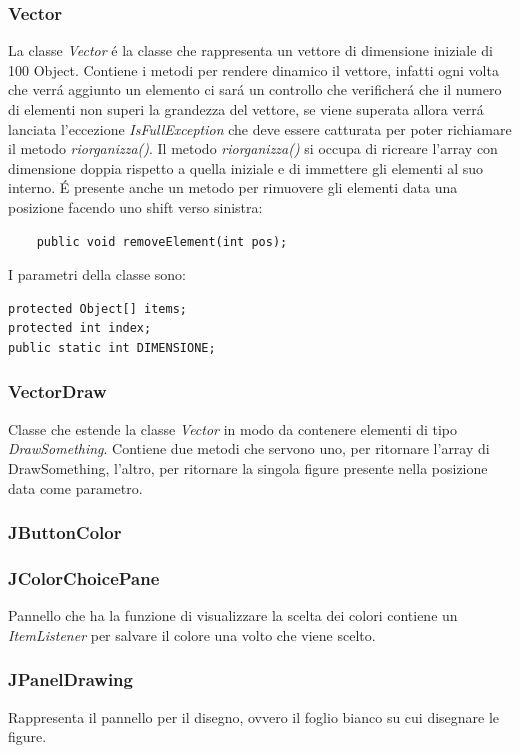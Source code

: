 \documentclass[a4paper,12pt,times,numbered,print,index]{article}
\begin{document}
\subsubsection{Vector}
La classe \textit{Vector} é la classe che rappresenta un vettore di dimensione iniziale di 100 Object. Contiene i metodi per rendere dinamico il vettore, infatti ogni volta che verrá aggiunto un elemento ci sará un controllo che verificherá che il numero di elementi non superi la grandezza del vettore, se viene superata allora verrá lanciata l'eccezione \textit{IsFullException} che deve essere catturata per poter richiamare il metodo \textit{riorganizza()}. Il metodo \textit{riorganizza()} si occupa di ricreare l'array con dimensione doppia rispetto a quella iniziale e di immettere gli elementi al suo interno.
É presente anche un metodo per rimuovere gli elementi data una posizione facendo uno shift verso sinistra:
\begin{lstlisting}
	public void removeElement(int pos);
\end{lstlisting}
I parametri della classe sono:
\begin{lstlisting}
protected Object[] items;
protected int index;
public static int DIMENSIONE;
\end{lstlisting}

\subsubsection{VectorDraw}
Classe che estende la classe \textit{Vector} in modo da contenere elementi di tipo \textit{DrawSomething}.
Contiene due metodi che servono uno, per ritornare l'array di DrawSomething, l'altro, per ritornare la singola figure presente nella posizione data come parametro.
\subsubsection{JButtonColor}

\subsubsection{JColorChoicePane}
Pannello che ha la funzione di visualizzare la scelta dei colori contiene un \textit{ItemListener} per salvare il colore una volto che viene scelto.
\subsubsection{JPanelDrawing}
Rappresenta il pannello per il disegno, ovvero il foglio bianco su cui disegnare le figure.
\end{document}
